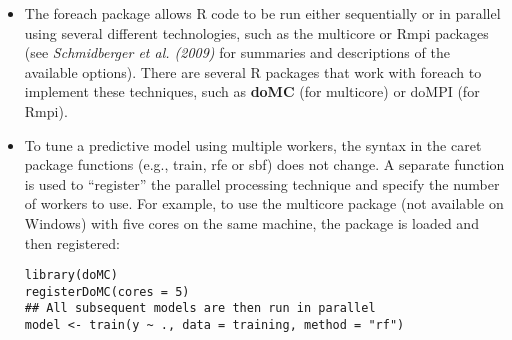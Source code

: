 \documentclass[caret-main.tex]{subfiles}
\begin{document}
\begin{itemize}
\item The foreach package allows R code to be run either sequentially or
in parallel using several different technologies, such as the multicore or Rmpi
packages (see \textit{Schmidberger et al. (2009)} for summaries and descriptions of
the available options). There are several R packages that work with foreach
to implement these techniques, such as \textbf{doMC} (for multicore) or doMPI (for
Rmpi).
\item To tune a predictive model using multiple workers, the syntax in the caret
package functions (e.g., train, rfe or sbf) does not change. A separate function
is used to “register” the parallel processing technique and specify the number
of workers to use. For example, to use the multicore package (not available
on Windows) with five cores on the same machine, the package is loaded and
then registered:

\begin{framed}
\begin{verbatim}
library(doMC)
registerDoMC(cores = 5)
## All subsequent models are then run in parallel
model <- train(y ~ ., data = training, method = "rf")
\end{verbatim}
\end{framed}


\end{itemize}
\end{document}
